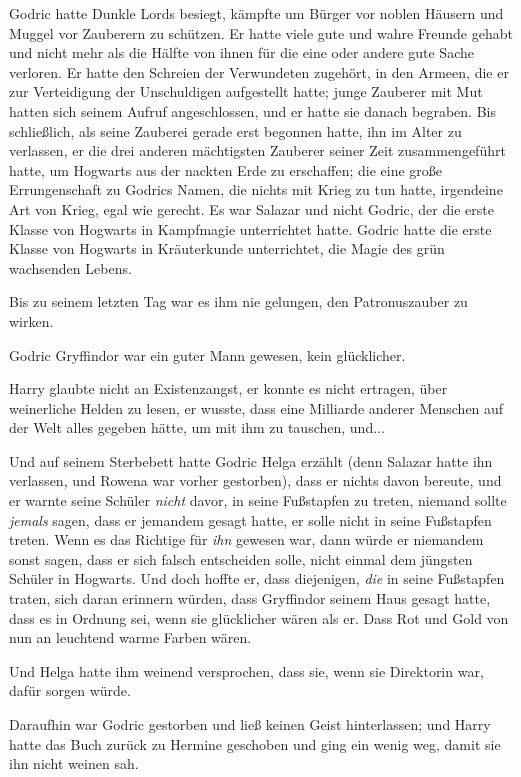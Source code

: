 {Godric hatte Dunkle Lords besiegt, kämpfte um Bürger vor noblen Häusern und Muggel vor Zauberern zu schützen. Er hatte viele gute und wahre Freunde gehabt und nicht mehr als die Hälfte von ihnen für die eine oder andere gute Sache verloren. Er hatte den Schreien der Verwundeten zugehört, in den Armeen, die er zur Verteidigung der Unschuldigen aufgestellt hatte; junge Zauberer mit Mut hatten sich seinem Aufruf angeschlossen, und er hatte sie danach begraben. Bis schließlich, als seine Zauberei gerade erst begonnen hatte, ihn im Alter zu verlassen, er die drei anderen mächtigsten Zauberer seiner Zeit zusammengeführt hatte, um Hogwarts aus der nackten Erde zu erschaffen; die eine große Errungenschaft zu Godrics Namen, die nichts mit Krieg zu tun hatte, irgendeine Art von Krieg, egal wie gerecht. Es war Salazar und nicht Godric, der die erste Klasse von Hogwarts in Kampfmagie unterrichtet hatte. Godric hatte die erste Klasse von Hogwarts in Kräuterkunde unterrichtet, die Magie des grün wachsenden Lebens.

Bis zu seinem letzten Tag war es ihm nie gelungen, den Patronuszauber zu wirken.

Godric Gryffindor war ein guter Mann gewesen, kein glücklicher.

Harry glaubte nicht an Existenzangst, er konnte es nicht ertragen, über weinerliche Helden zu lesen, er wusste, dass eine Milliarde anderer Menschen auf der Welt alles gegeben hätte, um mit ihm zu tauschen, und...

Und auf seinem Sterbebett hatte Godric Helga erzählt (denn Salazar hatte ihn verlassen, und Rowena war vorher gestorben), dass er nichts davon bereute, und er warnte seine Schüler \emph{nicht} davor, in seine Fußstapfen zu treten, niemand sollte \emph{jemals} sagen, dass er jemandem gesagt hatte, er solle nicht in seine Fußstapfen treten. Wenn es das Richtige für \emph{ihn} gewesen war, dann würde er niemandem sonst sagen, dass er sich falsch entscheiden solle, nicht einmal dem jüngsten Schüler in Hogwarts. Und doch hoffte er, dass diejenigen, \emph{die} in seine Fußstapfen traten, sich daran erinnern würden, dass Gryffindor seinem Haus gesagt hatte, dass es in Ordnung sei, wenn sie glücklicher wären als er. Dass Rot und Gold von nun an leuchtend warme Farben wären.

Und Helga hatte ihm weinend versprochen, dass sie, wenn sie Direktorin war, dafür sorgen würde.

Daraufhin war Godric gestorben und ließ keinen Geist hinterlassen; und Harry hatte das Buch zurück zu Hermine geschoben und ging ein wenig weg, damit sie ihn nicht weinen sah.

}
